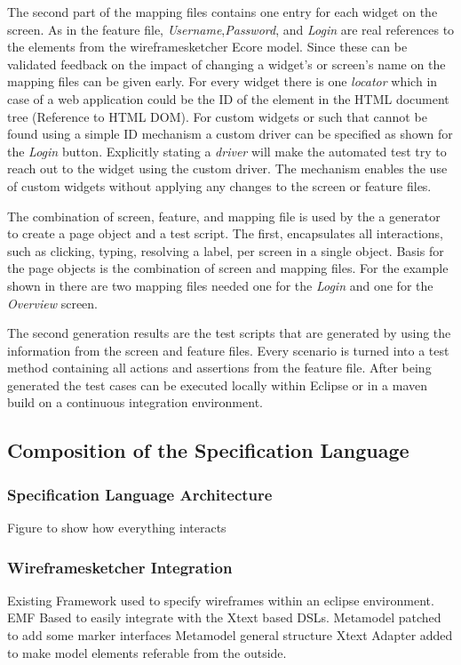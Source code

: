 \documentclass{sig-alternate-05-2015}
\begin{document}
The second part of the mapping files contains one entry for each widget on the screen.
As in the feature file, \textit{Username},\textit{Password}, and \textit{Login} are real references to the elements from the wireframesketcher Ecore model.
Since these can be validated feedback on the impact of changing a widget's or screen's name on the mapping files can be given early.
For every widget there is one \textit{locator} which in case of a web application could be the ID of the element in the HTML document tree (Reference to HTML DOM).
For custom widgets or such that cannot be found using a simple ID mechanism a custom driver can be specified as shown for the \textit{Login} button.
Explicitly stating a \textit{driver} will make the automated test try to reach out to the widget using the custom driver. 
The mechanism enables the use of custom widgets without applying any changes to the screen or feature files.

The combination of screen, feature, and mapping file is used by the a generator to create a page object and a test script.
The first, encapsulates all interactions, such as clicking, typing, resolving a label, per screen in a single object.
Basis for the page objects is the combination of screen and mapping files.
For the example shown in  there are two mapping files needed one for the \textit{Login} and one for the \textit{Overview} screen.

The second generation results are the test scripts that are generated by using the information from the screen and feature files.
Every scenario is turned into a test method containing all actions and assertions from the feature file.
After being generated the test cases can be executed locally within Eclipse or in a maven build on a continuous integration environment.


\subsection{Composition of the Specification Language}
\subsubsection{Specification Language Architecture}
Figure to show how everything interacts
\subsubsection{Wireframesketcher Integration}
Existing Framework used to specify wireframes within an eclipse environment.
EMF Based to easily integrate with the Xtext based DSLs.
Metamodel patched to add some marker interfaces
Metamodel general structure
Xtext Adapter added to make model elements referable from the outside.
\end{document}
